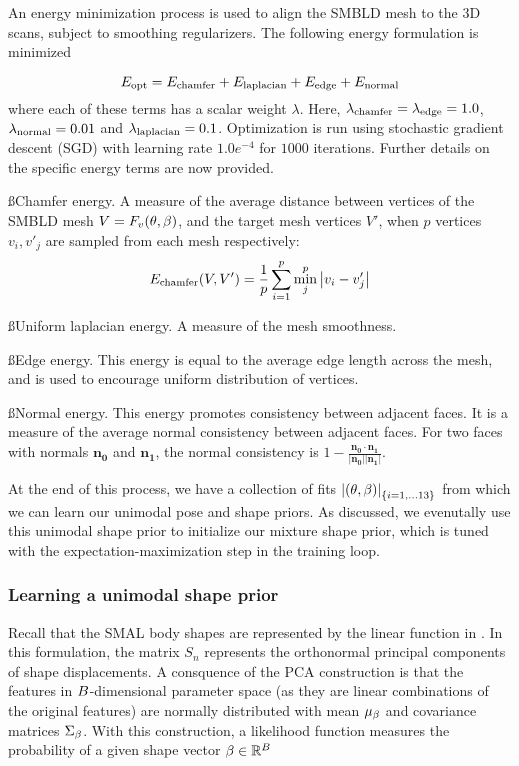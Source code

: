 An energy minimization process is used to align the SMBLD mesh to the 3D scans, subject to smoothing regularizers. The following energy formulation is minimized

\begin{equation}
    E_\textrm{opt} = E_\textrm{chamfer} + E_\textrm{laplacian} + E_\textrm{edge} + E_\textrm{normal}
\end{equation}
where each of these terms has a scalar weight $\lambda$. Here, $\lambda_\textrm{chamfer}=\lambda_\textrm{edge}=1.0$, $\lambda_\textrm{normal}=0.01$ and $\lambda_\textrm{laplacian}=0.1$. Optimization is run using stochastic gradient descent (SGD) with learning rate $1.0e^{-4}$ for $1000$ iterations. Further details on the specific energy terms are now provided.

\ss{Chamfer energy.} A measure of the average distance between vertices of the SMBLD mesh $V=F_v(\theta, \beta)$, and the target mesh vertices $V'$, when $p$ vertices $v_{i}, v'_{j}$ are sampled from each mesh respectively:
\begin{equation}
        E_\textrm{chamfer}(V, V') = \frac{1}{p} \sum_{i=1}^p \min_j^p  \left | v_{i} - v'_{j} \right |
\end{equation}

\ss{Uniform laplacian energy.} A measure of the mesh smoothness.

\ss{Edge energy.} This energy is equal to the average edge length across the mesh, and is used to encourage uniform distribution of vertices.

\ss{Normal energy.} This energy promotes consistency between adjacent faces. It is a measure of the average normal consistency between adjacent faces. For two faces with normals $\mathbf{n_0}$ and $\mathbf{n_1}$, the normal consistency is $1 - \frac{\mathbf{n_0} \cdot \mathbf{n_1}}{\left|\mathbf{n_0}\right|\left|\mathbf{n_1}\right|}$.

At the end of this process, we have a collection of fits $\left|(\theta,\beta)\right|_{\{i=1,...13\}}$ from which we can learn our unimodal pose and shape priors. As discussed, we evenutally use this unimodal shape prior to initialize our mixture shape prior, which is tuned with the expectation-maximization step in the training loop.

\subsubsection{Learning a unimodal shape prior}

Recall that the SMAL body shapes are represented by the linear function in . In this formulation, the matrix $S_{n}$ represents the orthonormal principal components of shape displacements. A consquence of the PCA construction is that the features in $B$-dimensional parameter space (as they are linear combinations of the original features) are normally distributed with mean $\mu_{\beta}$ and covariance matrices $\Sigma_{\beta}$. With this construction, a likelihood function measures the probability of a given shape vector $\beta \in {\mathbb{R}^{B}}$

